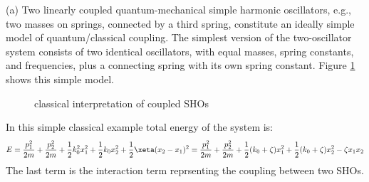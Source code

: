 \begin{homeworkProblem}
\begin{homeworkSection}{(a)}
Two linearly coupled quantum-mechanical simple harmonic oscillators, e.g., two masses on springs,
connected by a third spring, constitute an ideally simple model of quantum/classical coupling. The simplest version of the two-oscillator system consists of two identical oscillators, with equal
masses, spring constants, and frequencies, plus a connecting spring with its own spring constant. Figure \ref{spring} shows this simple model.
\begin{figure}[!h]
\centering

\caption{\small classical interpretation of coupled SHOs}
\label{spring}
\end{figure}


In this simple classical example total energy of the system is:
\begin{equation}
E=\frac{p^2_1}{2m}+\frac{p^2_2}{2m}+\frac{1}{2}k_0^2x_1^2+\frac{1}{2}k_0x_2^2+\frac{1}{2}\xeta(x_2-x_1)^2=
\frac{p^2_1}{2m}+\frac{p^2_2}{2m}+\frac{1}{2}(k_0+\zeta)x_1^2+\frac{1}{2}(k_0+\zeta)x_2^2-\zeta x_1x_2
\end{equation}
The last term is the interaction term reprsenting the coupling between two SHOs. 
\end{homeworkSection}


\end{homeworkProblem}
